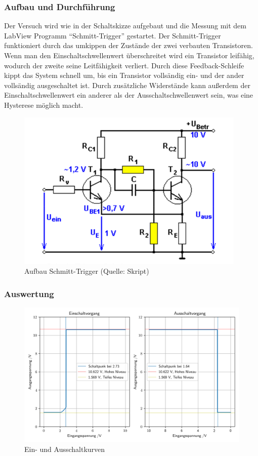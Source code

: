 \documentclass[12pt,twoside,a4paper]{scrartcl}
\begin{document}
			\subsubsection{Aufbau und Durchführung}
				Der Versuch wird wie in der Schaltskizze aufgebaut und die Messung mit dem LabView Programm \enquote{Schmitt-Trigger} gestartet.
				Der Schmitt-Trigger funktioniert durch das umkippen der Zustände der zwei verbauten Transistoren. Wenn man den Einschaltschwellenwert überschreitet wird ein Transistor leifähig, wodurch der zweite seine Leitfähigkeit verliert. Durch diese Feedback-Schleife kippt das System schnell um, bis ein Transistor vollsändig ein- und der ander vollsändig ausgeschaltet ist. Durch zusätzliche Widerstände kann außerdem der Einschaltschwellenwert ein anderer als der Ausschaltschwellenwert sein, was eine Hysterese möglich macht.

				\begin{figure}[H]
					\centering
					\includegraphics[width = 0.8 \textwidth]{Pictures/schmitt}
					\caption{Aufbau Schmitt-Trigger (Quelle: Skript)}
				\end{figure}

			\subsubsection{Auswertung}

			\begin{figure}[H]
				\includegraphics[width = 0.8 \textwidth]{Plots/schmitt/schmitt_trigger}
				\caption{Ein- und Ausschaltkurven}
				\label{Schmitt}
			\end{figure}
\end{document}
